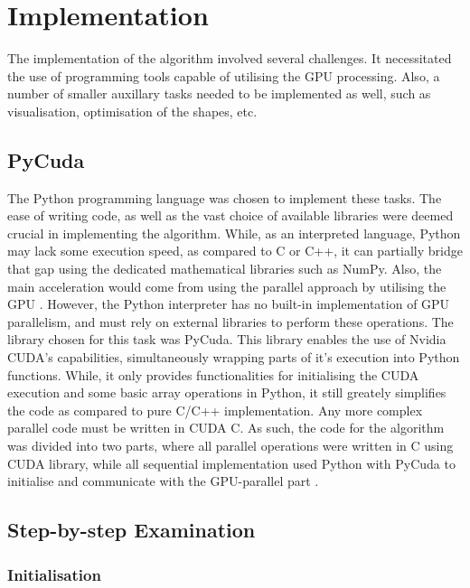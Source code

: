 \documentclass[12pt, oneside]{report}
\begin{document}
\section {Implementation}

The implementation of the algorithm involved several challenges. It necessitated the use of programming tools capable of utilising the GPU processing. Also, a number of smaller auxillary tasks needed to be implemented as well, such as visualisation, optimisation of the shapes, etc.

\subsection{PyCuda}

The Python programming language was chosen to implement these tasks. The ease of writing code, as well as the vast choice of available libraries were deemed crucial in implementing the algorithm. While, as an interpreted language, Python may lack some execution speed, as compared to C or C++, it can partially bridge that gap using the dedicated mathematical libraries such as NumPy. Also, the main acceleration would come from using the parallel approach by utilising the GPU \cite{numpy}. \newline
However, the Python interpreter has no built-in implementation of GPU parallelism, and must rely on external libraries to perform these operations. The library chosen for this task was PyCuda. This library enables the use of Nvidia CUDA's capabilities, simultaneously wrapping parts of it's execution into Python functions. While, it only provides functionalities for initialising the CUDA execution and some basic array operations in Python, it still greately simplifies the code as compared to pure C/C++ implementation. Any more complex parallel code must be written in CUDA C. As such, the code for the algorithm was divided into two parts, where all parallel operations were written in C using CUDA library, while all sequential implementation used Python with PyCuda to initialise and communicate with the GPU-parallel part \cite{pycuda}.


\subsection{Step-by-step Examination}

\subsubsection{Initialisation}
\end{document}
